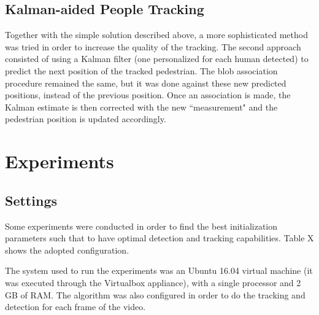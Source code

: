 \documentclass[runningheads]{llncs}
\begin{document}
\subsection{Kalman-aided People Tracking}

Together with the simple solution described above, a more sophisticated method was tried in order to increase the quality of the tracking. The second approach consisted of using a Kalman filter (one personalized for each human detected) to predict the next position of the tracked pedestrian. The blob association procedure remained the same, but it was done against these new predicted positions, instead of the previous position. Once an association is made, the Kalman estimate is then corrected with the new ``measurement" and the pedestrian position is updated accordingly.


\section{Experiments}

\subsection{Settings}
Some experiments were conducted in order to find the best initialization parameters such that to have optimal detection and tracking capabilities. Table X shows the adopted configuration. 

The system used to run the experiments was an Ubuntu 16.04 virtual machine (it was executed through the Virtualbox appliance), with a single processor and 2 GB of RAM. The algorithm was also configured in order to do the tracking and detection for each frame of the video.

\begin{table}[h]
\centering
\caption{Final parameters for the algorithm}
\label{table:params}
\end{table}
\end{document}
